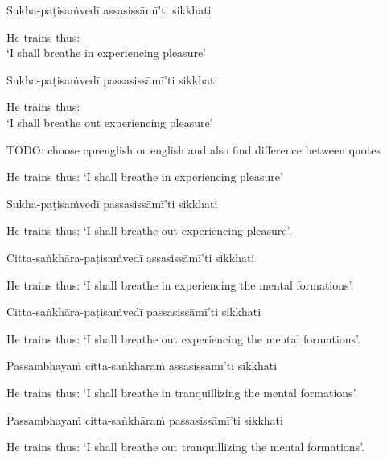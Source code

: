 Sukha-paṭisaṁvedī assasissāmī’ti sikkhati

\begin{cprenglish}
  He trains thus:\\
  ‘I shall breathe in experiencing pleasure’
\end{cprenglish}

Sukha-paṭisaṁvedī passasissāmī’ti sikkhati

\begin{cprenglish}
  He trains thus:\\
  ‘I shall breathe out experiencing pleasure’
\end{cprenglish}

TODO: choose cprenglish or english and also find difference between quotes

\begin{english}
  He trains thus: `I shall breathe in experiencing pleasure'
\end{english}

Sukha-paṭisaṁvedī passasissāmī'ti sikkhati

\begin{english}
  He trains thus: `I shall breathe out experiencing pleasure'.
\end{english}

Citta-saṅkhāra-paṭisaṁvedī assasissāmī'ti sikkhati

\begin{english}
  He trains thus: `I shall breathe in experiencing the mental formations'.
\end{english}

Citta-saṅkhāra-paṭisaṁvedī passasissāmī'ti sikkhati

\begin{english}
  He trains thus: `I shall breathe out experiencing the mental formations'.
\end{english}

Passambhayaṁ citta-saṅkhāraṁ assasissāmī'ti sikkhati

\begin{english}
  He trains thus: `I shall breathe in tranquillizing the mental formations'.
\end{english}

Passambhayaṁ citta-saṅkhāraṁ passasissāmī'ti sikkhati

\begin{english}
  He trains thus: `I shall breathe out tranquillizing the mental formations'.
\end{english}

